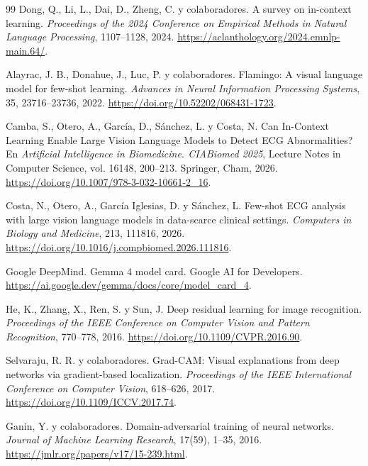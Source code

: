 \begin{thebibliography}{99}
Dong, Q., Li, L., Dai, D., Zheng, C. y colaboradores.
\newblock A survey on in-context learning.
\newblock \emph{Proceedings of the 2024 Conference on Empirical Methods in Natural Language Processing}, 1107--1128, 2024.
\newblock \url{https://aclanthology.org/2024.emnlp-main.64/}.

Alayrac, J. B., Donahue, J., Luc, P. y colaboradores.
\newblock Flamingo: A visual language model for few-shot learning.
\newblock \emph{Advances in Neural Information Processing Systems}, 35, 23716--23736, 2022.
\newblock \url{https://doi.org/10.52202/068431-1723}.

Camba, S., Otero, A., García, D., Sánchez, L. y Costa, N.
\newblock Can In-Context Learning Enable Large Vision Language Models to Detect ECG Abnormalities?
\newblock En \emph{Artificial Intelligence in Biomedicine. CIABiomed 2025}, Lecture Notes in Computer Science, vol. 16148, 200--213. Springer, Cham, 2026.
\newblock \url{https://doi.org/10.1007/978-3-032-10661-2_16}.

Costa, N., Otero, A., García Iglesias, D. y Sánchez, L.
\newblock Few-shot ECG analysis with large vision language models in data-scarce clinical settings.
\newblock \emph{Computers in Biology and Medicine}, 213, 111816, 2026.
\newblock \url{https://doi.org/10.1016/j.compbiomed.2026.111816}.

Google DeepMind.
\newblock Gemma 4 model card.
\newblock Google AI for Developers.
\newblock \url{https://ai.google.dev/gemma/docs/core/model_card_4}.

He, K., Zhang, X., Ren, S. y Sun, J.
\newblock Deep residual learning for image recognition.
\newblock \emph{Proceedings of the IEEE Conference on Computer Vision and Pattern Recognition}, 770--778, 2016.
\newblock \url{https://doi.org/10.1109/CVPR.2016.90}.

Selvaraju, R. R. y colaboradores.
\newblock Grad-CAM: Visual explanations from deep networks via gradient-based localization.
\newblock \emph{Proceedings of the IEEE International Conference on Computer Vision}, 618--626, 2017.
\newblock \url{https://doi.org/10.1109/ICCV.2017.74}.

Ganin, Y. y colaboradores.
\newblock Domain-adversarial training of neural networks.
\newblock \emph{Journal of Machine Learning Research}, 17(59), 1--35, 2016.
\newblock \url{https://jmlr.org/papers/v17/15-239.html}.


\end{thebibliography}
